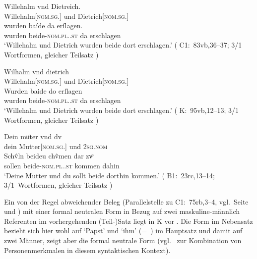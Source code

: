 \begin{exe}
\ex \label{ex:dietwill2} %
	\begin{xlist}
	\ex \label{ex:dietwill2_2}
		\gll Willehalm vnd Dietreich. \\
			Willehalm[\textsc{nom.sg.\MascM}] und
				Dietrich[\textsc{nom.sg.\MascM}] \\
	\sn \gll wurden baíde da erſlagen. \\
			wurden beide-\textsc{nom.pl.\MascM.st} da erschlagen \\
		\trans `Willehalm und Dietrich wurden beide dort erschlagen.'
			(%
				C1:~83vb,36--37;
				3/1 Wortformen, gleicher Teilsatz%
			)

	\ex \label{ex:dietwill2_3}
		\gll Wilhalm vnd dietrich \\
			Willehalm[\textsc{nom.sg.\MascM}] und
				Dietrich[\textsc{nom.sg.\MascM}] \\
	\sn \gll Wurden baide do erſlagen \\
			wurden beide-\textsc{nom.pl.\MascM.st} da erschlagen \\
		\trans `Willehalm und Dietrich wurden beide dort erschlagen.'
			(%
				K:~95vb,12--13;
				3/1 Wortformen, gleicher Teilsatz%
			)
	\end{xlist}

\ex \label{ex:mutterdu2}
	\gll Dein muͦter vnd dv \\
		dein Mutter[\textsc{nom.sg.\FemF}] und \textsc{2sg\subM.nom} \\
\sn \gll Schv̂ln beideu chv̂men {dar zvͦ} \\
		sollen beide-\textsc{nom.pl.\NeutMF.st} kommen dahin \\
	\trans `Deine Mutter und du  sollt beide dorthin
		kommen.'
		(%
			B1:~23rc,13--14;
			3/1~Wortformen, gleicher Teilsatz%
		)
\end{exe}

\label{phsec:baideuwarn3}
Ein von der Regel abweichender Beleg
(Parallelstelle zu C1:~75rb,3--4, vgl.~Seite
\pageref{phsec:babstimbaideu} und \pageref{phsec:baideuwarn}) mit einer formal
neutralen Form in Bezug auf zwei maskuline-männlich Referenten im
vorhergehenden (Teil-)Satz liegt in K vor . Die Form
 im Nebensatz bezieht sich hier wohl auf  `Papst' und
 `ihm' (=~) im Hauptsatz und damit auf zwei Männer, zeigt
aber die formal neutrale Form (vgl.~ zur
Kombination von Personenmerkmalen in diesem syntaktischen Kontext).

